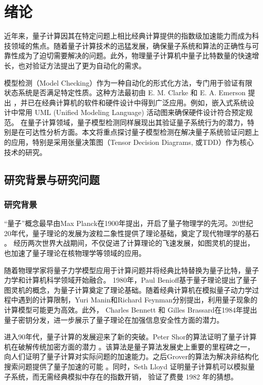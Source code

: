 \chapter{绪论}
近年来，量子计算因其在特定问题上相比经典计算提供的指数级加速能力而成为科技领域的焦点。随着量子计算技术的迅猛发展，确保量子系统和算法的正确性与可靠性成为了迫切需要解决的问题。此外，物理量子计算机中量子比特数量的快速增长，也对验证方法提出了更为自动化的需求。

模型检测（Model Checking）作为一种自动化的形式化方法，专门用于验证有限状态系统是否满足特定性质。这种方法最初由 E. M. Clarke 和 E. A. Emerson 提出
\citep{Emerson_1980,Clarke,Clarke_1986}，并已在经典计算机的软件和硬件设计中得到广泛应用。例如，嵌入式系统设计中常用 UML (Unified Modeling Language) 活动图来确保硬件设计符合预定规范\citep{Grobelna_2015}。
在量子计算领域，量子模型检测同样展现出其验证量子系统行为的潜力，特别是在可达性分析方面。本文将重点探讨量子模型检测在解决量子系统验证问题上的应用，特别是采用张量决策图（Tensor Decision Diagrams, 或TDD）作为核心技术的研究。


\section{研究背景与研究问题}
\subsection{研究背景}
“量子”概念最早由Max Planck在1900年提出，开启了量子物理学的先河\citep{planck1901law}。20世纪20年代，量子理论的发展为波粒二象性提供了理论基础，奠定了现代物理学的基石
\citep{bhatta2020plurality}。
经历两次世界大战期间，不仅促进了计算理论的飞速发展，如图灵机的提出\citep{hodges2014alan}，也加速了量子理论在核物理学等领域的应用\citep{maartensson2006manhattan}。

随着物理学家将量子力学模型应用于计算问题并将经典比特替换为量子比特，量子力学和计算机科学领域开始融合。 1980年，Paul Benioff基于量子理论提出了量子图灵机的概念，为量子计算奠定了理论基础\citep{benioff1980computer}。随着经典计算机在模拟量子动力学过程中遇到的计算限制，Yuri Manin和Richard Feynman分别提出，利用量子现象的计算模型可能更为高效\citep{Feynman,manin1980vychislimoe}。此外， Charles Bennett 和 Gilles Brassard在1984年提出量子密钥分发，进一步展示了量子理论在加强信息安全性方面的潜力\citep{bennett2014quantum}。


进入90年代，量子计算的发展迎来了新的突破。Peter Shor的算法证明了量子计算机在破解传统加密方面的潜力\citep{Shor} 。该算法是量子算法发展史上重要的里程碑之一，向人们证明了量子计算对实际问题的加速能力。之后Grover的算法为解决非结构化搜索问题提供了量子加速的可能\citep{Grover_1996} 。同时，Seth Lloyd 证明量子计算机可以模拟量子系统，而无需经典模拟中存在的指数开销\citep{lloyd1996universal}， 验证了费曼 1982 年的猜想\citep{cao2019quantum}。

